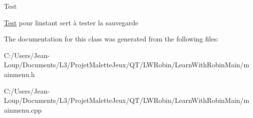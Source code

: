 \begin{DoxyRefDesc}{Test}
\item[\hyperlink{test__test000002}{Test}]pour l\textquotesingle{}instant sert à tester la sauvegarde \end{DoxyRefDesc}


The documentation for this class was generated from the following files\+:\begin{DoxyCompactItemize}
\item 
C\+:/\+Users/\+Jean-\/\+Loup/\+Documents/\+L3/\+Projet\+Malette\+Jeux/\+Q\+T/\+L\+W\+Robin/\+Learn\+With\+Robin\+Main/mainmenu.\+h\item 
C\+:/\+Users/\+Jean-\/\+Loup/\+Documents/\+L3/\+Projet\+Malette\+Jeux/\+Q\+T/\+L\+W\+Robin/\+Learn\+With\+Robin\+Main/mainmenu.\+cpp\end{DoxyCompactItemize}
